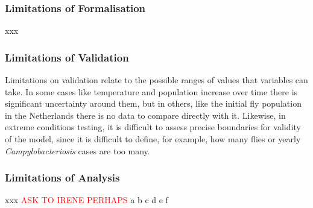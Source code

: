\subsubsection{Limitations of Formalisation}
xxx

\subsubsection{Limitations of Validation}

Limitations on validation relate to the possible ranges of values that variables can take. In some cases like temperature and population increase over time there is significant uncertainty around them, but in others, like the initial fly population in the Netherlands there is no data to compare directly with it. Likewise, in extreme conditions testing, it is difficult to assess precise boundaries for validity of the model, since it is difficult to define, for example, how many flies or yearly \textit{Campylobacteriosis} cases are too many.

\subsubsection{Limitations of Analysis}
xxx
\textcolor{red}{ASK TO IRENE PERHAPS}
a b c d e f

